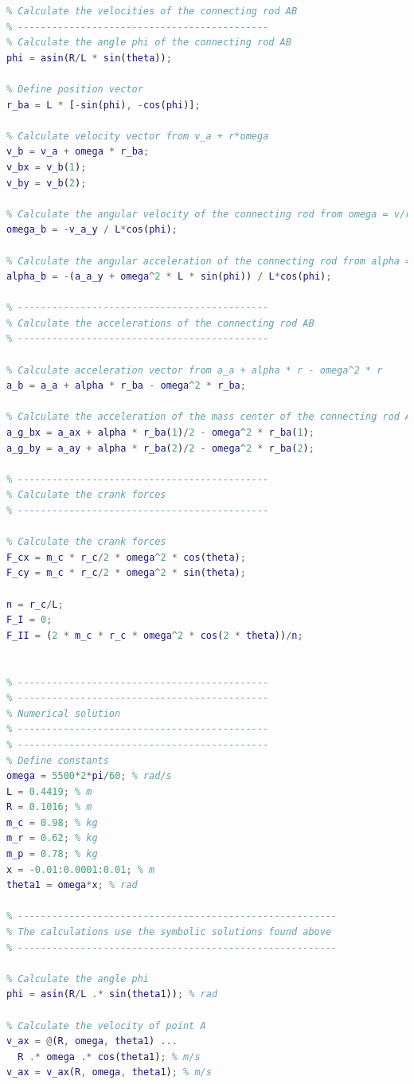 \documentclass[12pt, titlepage]{article}
\begin{document}
\begin{lstlisting}[language=Matlab, style=mystyle]
% --------------------------------------------
% Calculate the velocities of the connecting rod AB
% --------------------------------------------
% Calculate the angle phi of the connecting rod AB
phi = asin(R/L * sin(theta));

% Define position vector
r_ba = L * [-sin(phi), -cos(phi)];

% Calculate velocity vector from v_a + r*omega
v_b = v_a + omega * r_ba;
v_bx = v_b(1);
v_by = v_b(2);

% Calculate the angular velocity of the connecting rod from omega = v/r
omega_b = -v_a_y / L*cos(phi);

% Calculate the angular acceleration of the connecting rod from alpha = a/r
alpha_b = -(a_a_y + omega^2 * L * sin(phi)) / L*cos(phi);

% --------------------------------------------
% Calculate the accelerations of the connecting rod AB
% --------------------------------------------

% Calculate acceleration vector from a_a + alpha * r - omega^2 * r
a_b = a_a + alpha * r_ba - omega^2 * r_ba;

% Calculate the acceleration of the mass center of the connecting rod AB
a_g_bx = a_ax + alpha * r_ba(1)/2 - omega^2 * r_ba(1);
a_g_by = a_ay + alpha * r_ba(2)/2 - omega^2 * r_ba(2);

% --------------------------------------------
% Calculate the crank forces
% --------------------------------------------

% Calculate the crank forces
F_cx = m_c * r_c/2 * omega^2 * cos(theta);
F_cy = m_c * r_c/2 * omega^2 * sin(theta);

n = r_c/L;
F_I = 0;
F_II = (2 * m_c * r_c * omega^2 * cos(2 * theta))/n;


% --------------------------------------------
% --------------------------------------------
% Numerical solution
% --------------------------------------------
% --------------------------------------------
% Define constants
omega = 5500*2*pi/60; % rad/s
L = 0.4419; % m
R = 0.1016; % m
m_c = 0.98; % kg
m_r = 0.62; % kg
m_p = 0.78; % kg
x = -0.01:0.0001:0.01; % m
theta1 = omega*x; % rad

% --------------------------------------------------------
% The calculations use the symbolic solutions found above
% --------------------------------------------------------

% Calculate the angle phi
phi = asin(R/L .* sin(theta1)); % rad

% Calculate the velocity of point A
v_ax = @(R, omega, theta1) ...
  R .* omega .* cos(theta1); % m/s
v_ax = v_ax(R, omega, theta1); % m/s


\end{lstlisting}
\end{document}
